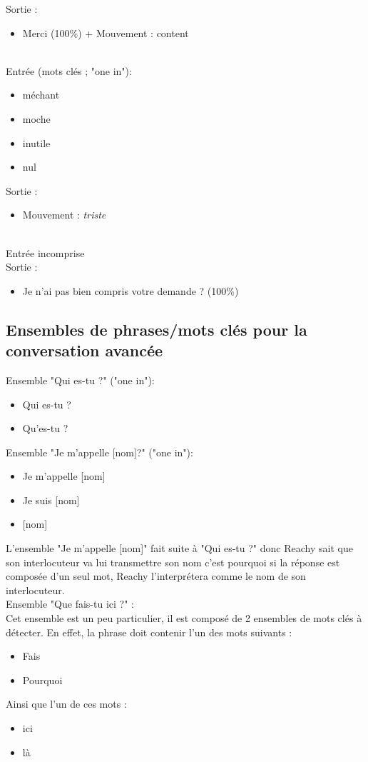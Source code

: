 Sortie :
\begin{itemize}
    \item Merci (100\%) + Mouvement : content
\end{itemize}
\ \\
Entrée (mots clés ; {\color{red}"one in"}): 
\begin{itemize}
    \item méchant
    \item moche
    \item inutile
    \item nul
\end{itemize}
Sortie :
\begin{itemize}
    \item Mouvement : \textit{triste}
\end{itemize}
\ \\
Entrée incomprise \\
Sortie :
\begin{itemize}
    \item Je n'ai pas bien compris votre demande ? (100\%)
\end{itemize}

\subsection{Ensembles de phrases/mots clés pour la conversation avancée}

Ensemble "Qui es-tu ?" {\color{red}("one in")}:
\begin{itemize}
    \item Qui es-tu ?
    \item Qu'es-tu ?\\
\end{itemize}

Ensemble "Je m'appelle [nom]?" {\color{red}("one in")}:
\begin{itemize}
    \item Je m'appelle [nom]
    \item Je suis [nom]
    \item{[nom] \\} 
\end{itemize}

L'ensemble "Je m'appelle [nom]" fait suite à "Qui es-tu ?" donc Reachy sait que son interlocuteur va lui transmettre son nom c'est pourquoi si la réponse est composée d'un seul mot, Reachy l'interprétera comme le nom de son interlocuteur. \\

Ensemble "Que fais-tu ici ?" : \\
Cet ensemble est un peu particulier, il est composé de 2 ensembles de mots clés à détecter. En effet, la phrase doit contenir l'un des mots suivants : 
\begin{itemize}
    \item Fais
    \item Pourquoi
\end{itemize}
Ainsi que l'un de ces mots :
\begin{itemize}
    \item ici
    \item là \\
\end{itemize}

